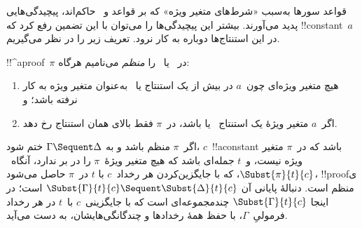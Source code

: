 \documentclass[../../../include/open-logic-section]{subfiles}
\begin{document}


قواعد سورها به‌سبب «شرط‌های متغیر ویژه» که بر قواعد
\LeftR{\lexists} و~\RightR{\lforall} حاکم‌اند، پیچیدگی‌هایی پدید
می‌آورند. بیشتر این پیچیدگی‌ها را می‌توان با این تضمین رفع کرد که
!!{constant}~$a$ در این استنتاج‌ها دوباره به کار نرود. تعریف زیر را
در نظر می‌گیریم.

\begin{defn}
!!^a{proof}~$\pi$ در~ یا~ را \emph{منظم} می‌نامیم
هرگاه:
\begin{enumerate}
  \item هیچ متغیر ویژه‌ای چون~$a$ در بیش از یک استنتاج
  \LeftR{\lexists} یا~\RightR{\lforall} به‌عنوان متغیر ویژه به کار
  نرفته باشد؛ و
  \item اگر~$a$ متغیر ویژهٔ یک استنتاج~\LeftR{\lexists} یا
  \RightR{\lforall} باشد، در~$\pi$ فقط بالای همان استنتاج رخ دهد.
\end{enumerate}
\end{defn}

\begin{lem} اگر~$\pi$ منظم باشد و به
$\Gamma \Sequent \Delta$ ختم شود، $c$~!!a{constant} باشد که در~$\pi$
متغیر ویژه نیست، و~$t$ جمله‌ای باشد که هیچ متغیر ویژهٔ~$\pi$ را در بر
ندارد، آنگاه~$\Subst{\pi}{t}{c}$، که با جایگزین‌کردن هر رخداد~$c$ با
$t$ در~$\pi$ حاصل می‌شود، !!{proof}ی منظم است. دنبالهٔ پایانی آن
$\Subst{\Gamma}{t}{c} \Sequent \Subst{\Delta}{t}{c}$ است؛ در اینجا
$\Subst{\Gamma}{t}{c}$ چندمجموعه‌ای است که با جایگزینی~$c$ با~$t$ در
هر رخداد فرمولیِ~$\Gamma$، با حفظ همهٔ رخدادها و چندگانگی‌هایشان، به دست
می‌آید.
\end{lem}
\end{document}
